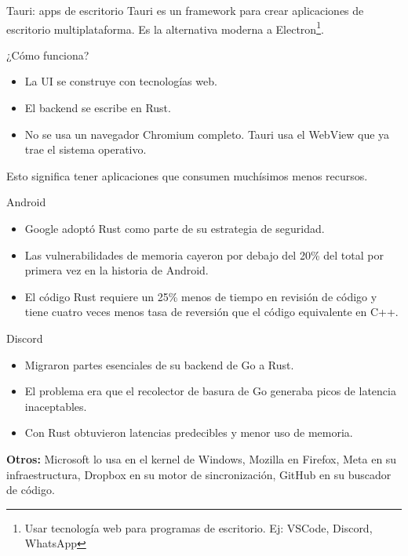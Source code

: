 \documentclass[11pt, aspectratio=169]{beamer}
\begin{document}
	\begin{frame}{Tauri: apps de escritorio}
		Tauri es un framework para crear aplicaciones de escritorio multiplataforma. Es la alternativa moderna a Electron\footnote{Usar tecnología web para programas de escritorio. Ej: VSCode, Discord, WhatsApp}.
		

			¿Cómo funciona?
			\begin{itemize}
				\item La UI se construye con tecnologías web.
				\item El backend se escribe en Rust.
				\item No se usa un navegador Chromium completo. Tauri usa el WebView que ya trae el sistema operativo.
			\end{itemize}

		Esto significa tener aplicaciones que consumen muchísimos menos recursos.


	\end{frame}

	\begin{frame}{Android}



			\begin{itemize}
				\item Google adoptó Rust como parte de su estrategia de seguridad.
				\item Las vulnerabilidades de memoria cayeron por debajo del 20\% del total por primera vez en la historia de Android.
				\item El código Rust requiere un 25\% menos de tiempo en revisión de código y tiene cuatro veces menos tasa de reversión que el código equivalente en C++.
			\end{itemize}
			

	\end{frame}

	\begin{frame}{Discord}

			\begin{itemize}
				\item Migraron partes esenciales de su backend de Go a Rust.
				\item El problema era que el recolector de basura de Go generaba picos de latencia inaceptables.
				\item Con Rust obtuvieron latencias predecibles y menor uso de memoria.
			\end{itemize}

		
		\textbf{Otros:} Microsoft lo usa en el kernel de Windows, Mozilla en Firefox, Meta en su infraestructura, Dropbox en su motor de sincronización, GitHub en su buscador de código.
	\end{frame}
\end{document}
